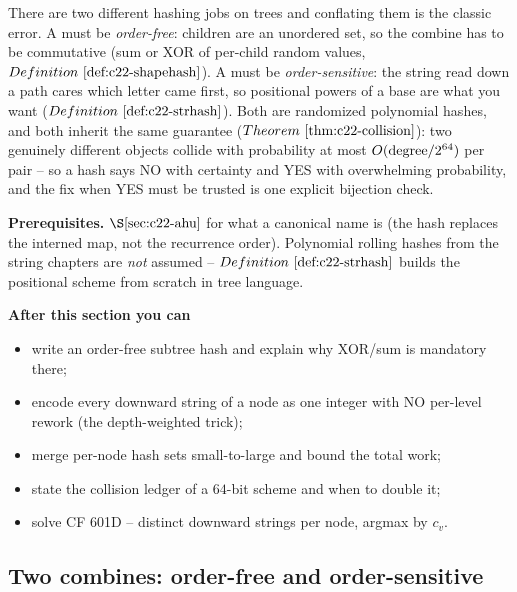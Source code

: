 \begin{topicintro}
There are two different hashing jobs on trees and conflating them is the classic
error.  A  must be \emph{order-free}: children are an unordered
set, so the combine has to be commutative (sum or XOR of per-child random values,
\(\defref{c22-shapehash}\)).  A  must be
\emph{order-sensitive}: the string read down a path cares which letter came first,
so positional powers of a base are what you want (\(\defref{c22-strhash}\)).  Both
are randomized polynomial hashes, and both inherit the same guarantee
(\(\thmref{c22-collision}\)): two genuinely different objects collide with
probability at most \(O(\text{degree}/2^{64})\) per pair -- so a hash says NO
with certainty and YES with overwhelming probability, and the fix when YES must be
trusted is one explicit bijection check.

\textbf{Prerequisites.} \(\secref{c22-ahu}\) for what a canonical name is (the hash
replaces the interned map, not the recurrence order).  Polynomial rolling hashes
from the string chapters are \emph{not} assumed -- \(\defref{c22-strhash}\) builds
the positional scheme from scratch in tree language.

\textbf{After this section you can}
\begin{itemize}[nosep]
  \item write an order-free subtree hash and explain why XOR/sum is mandatory there; \hfill{}
  \item encode every downward string of a node as one integer with NO per-level rework (the depth-weighted trick); \hfill{}
  \item merge per-node hash sets small-to-large and bound the total work; \hfill{}
  \item state the collision ledger of a \(64\)-bit scheme and when to double it; \hfill{}
  \item solve CF 601D -- distinct downward strings per node, argmax by \(c_v\). \hfill{}
\end{itemize}
\end{topicintro}

\subsection{Two combines: order-free and order-sensitive}

